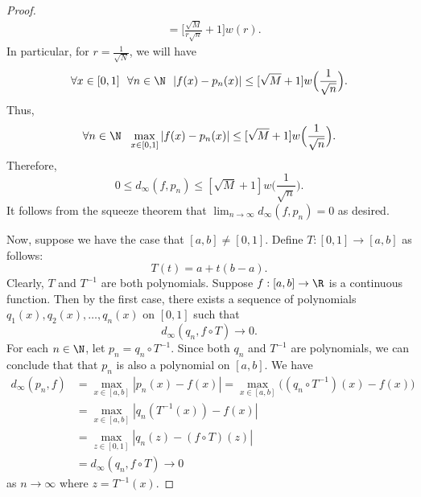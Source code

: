\begin{proof}
\begin{align*}
                              &= \Big[ \frac{ \sqrt{ M }  }{ r \sqrt{ n }  }  + 1 \Big] w(r). 
    \end{align*}
    In particular, for \( r = \frac{ 1  }{ \sqrt{  N  }  }  \), we will have 
    \[  \forall x \in [0,1] \ \ \forall n \in \N \ \ | f(x) - {p}_{n}(x)  | \leq [\sqrt{  M  }  + 1 ] w \Big(  \frac{ 1 }{ \sqrt{ n }  }  \Big). \] 
    Thus, 
    \[  \forall n \in \N  \ \ \max_{x \in [0,1]} | f(x) - {p}_{n}(x)  |  \leq [\sqrt{ M  }  + 1 ] w  \Big(  \frac{ 1 }{ \sqrt{ n }  }  \Big). \]
    Therefore, 
    \[  0 \leq {d}_{\infty }(f, {p}_{n}) \leq [\sqrt{ M }  + 1] w \Big(  \frac{ 1 }{ \sqrt{ n }  }  \Big). \]
    It follows from the squeeze theorem that \( \lim_{ n \to \infty  }  {d}_{\infty }(f,{p}_{n}) = 0 \) as desired.

    Now, suppose we have the case that \( [a,b] \neq [0,1] \). Define \( T: [0,1] \to [a,b] \) as follows: 
    \[  T(t) = a + t(b-a). \]
    Clearly, \( T  \) and \( T^{-1} \) are both polynomials. Suppose \( f:[a,b] \to \R  \) is a continuous function. Then by the first case, there exists a sequence of polynomials \( {q}_{1}(x), {q}_{2}(x), \dots, {q}_{n}(x) \) on \( [0,1] \) such that 
    \[  {d}_{\infty }({q}_{n}, f \circ T) \to 0.   \]
    For each \( n \in \N  \), let \( {p}_{n} = {q}_{n} \circ T^{-1} \). Since both \( {q}_{n}  \) and \( T^{-1} \) are polynomials, we can conclude that that \( {p}_{n} \) is also a polynomial on \( [a,b] \). We have
    \begin{align*}
        {d}_{\infty }({p}_{n},f) &= \max_{x \in [a,b]} | {p}_{n}(x) - f(x)  |  = \max_{x \in [a,b]} \Big(  ({q}_{n} \circ T^{-1}) (x) - f(x) \Big) \\
                                 &= \max_{x \in [a,b]} | {q}_{n} (T^{-1}(x)) - f(x) |  \\
                                 &= \max_{z \in [0,1]} | {q}_{n}(z) - (f \circ T)(z)  |  \\
                                 &= {d}_{\infty }({q}_{n}, f \circ T) \to 0 
    \end{align*}
    as \( n \to \infty  \) where \( z = T^{-1}(x) \).
\end{proof}


